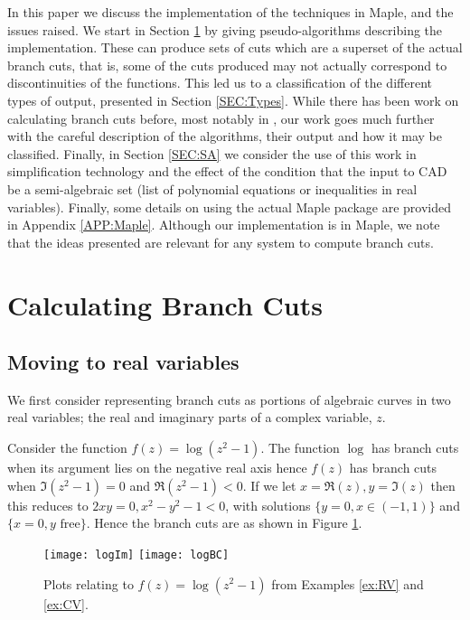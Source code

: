 \documentclass{llncs}
\begin{document}
In this paper we discuss the implementation of the techniques in {\sc Maple}, and the issues raised.  We start in Section \ref{SEC:Calc} by giving pseudo-algorithms describing the implementation.  
These can produce sets of cuts which are a superset of the actual branch cuts, that is, some of the cuts produced may not actually correspond to discontinuities of the functions.  This led us to a classification of the different types of output, presented in Section \ref{SEC:Types}.   
While there has been work on calculating branch cuts before, most notably in \cite{DF94}, our work goes much further with the careful description of the algorithms, their output and how it may be classified. 
Finally, in Section \ref{SEC:SA} we consider the use of this work in simplification technology and the effect of the condition that the input to CAD be a semi-algebraic set (list of polynomial equations or inequalities in real variables). Finally, some details on using the actual {\sc Maple} package are provided in Appendix \ref{APP:Maple}.
Although our implementation is in {\sc Maple}, we note that the ideas presented are relevant for any system to compute branch cuts.  




\section{Calculating Branch Cuts} \label{SEC:Calc}



\subsection{Moving to real variables}

We first consider representing branch cuts as portions of algebraic curves in two real variables; the real and imaginary parts of a complex variable, $z$.  

\begin{example}
\label{ex:RV}
Consider the function $f(z) = \log(z^2-1)$.  The function $\log$ has branch cuts when its argument lies on the negative real axis hence $f(z)$ has branch cuts when $\Im(z^2-1)=0$ and $\Re(z^2-1)<0$.  If we let $x=\Re(z), y=\Im(z)$ then this reduces to 
$2xy = 0, x^2-y^2-1 < 0$,   
with solutions $\{y=0, x \in (-1,1)\}$ and $\{x=0, y \mbox{ free} \}$.  Hence the branch cuts are as shown in Figure \ref{fig:log}.  
\end{example}

\begin{figure}[ht] 
\begin{center}
\texttt{[image: logIm]}
\hspace*{0.3cm}
\texttt{[image: logBC]}
\end{center}
\caption{Plots relating to $f(z)=\log(z^2-1)$ from Examples \ref{ex:RV} and \ref{ex:CV}.} 
\label{fig:log}
\end{figure}
\end{document}
